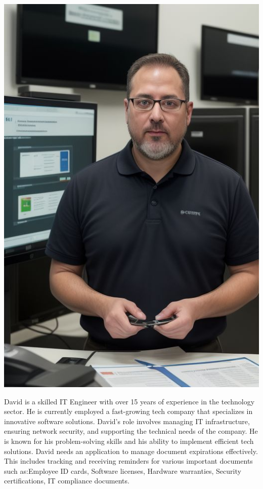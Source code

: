 \begin{minipage}[t]{0.3\textwidth} %
	\vspace{0pt} %
	\centering
	\vspace{0pt}
	\includegraphics[width=\textwidth]{../Draw.io diagrams/david.jpeg}
\end{minipage}%
\hfill
\begin{minipage}[t]{0.65\textwidth} %
	\vspace{0pt} %
	\vbox{David is a skilled IT Engineer with over 15 years of experience in the technology sector. He is currently employed a fast-growing tech company that specializes in innovative software solutions. David's role involves managing IT infrastructure, ensuring network security, and supporting the technical needs of the company. He is known for his problem-solving skills and his ability to implement efficient tech solutions. David needs an application to manage document expirations effectively. This includes tracking and receiving reminders for various important documents such as:Employee ID cards,	Software licenses, Hardware warranties,	Security certifications, IT compliance documents.}
\end{minipage}
